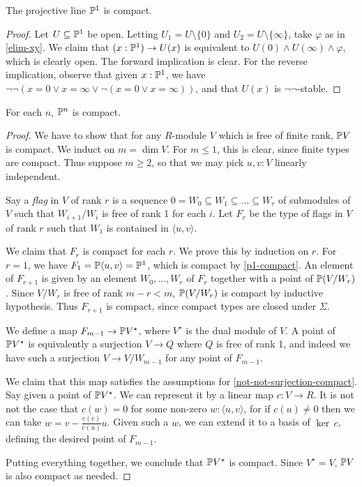 \begin{theorem}\label{p1-compact}
	The projective line $\mathbb{P}^1$ is compact.
\end{theorem}
\begin{proof}
	Let $U \subseteq \mathbb{P}^1$ be open. Letting $U_1 = U \setminus\{0\}$ and
	$U_2 = U\setminus\{\infty\}$, take $\varphi$ as in \cref{elim-xy}.
	We claim that $(x : \mathbb{P}^1) \to U(x)$ is equivalent to
	$U(0) \wedge U(\infty) \wedge \varphi$, which is clearly open.
	The forward implication is clear. For the reverse implication,
	observe that given $x : \mathbb{P}^1$, we have
	$\neg \neg(x = 0 \vee x = \infty \vee \neg (x = 0 \vee x = \infty))$,
	and that $U(x)$ is $\neg \neg$-stable.
\end{proof}

\begin{theorem}
	For each $n$, $\mathbb{P}^n$ is compact.
\end{theorem}
\begin{proof}
	We have to show that for any $R$-module $V$ which is free of finite rank,
	$\mathbb{P} V$ is compact. We induct on $m = \dim V$.
	For $m\le 1$, this is clear, since finite types are compact.
	Thus suppose $m \ge 2$, so that we may pick $u,v : V$ linearly independent.

	Say a \emph{flag} in $V$ of rank $r$ is a sequence
	$0 = W_0 \subseteq W_1 \subseteq \ldots \subseteq W_r$
	of submodules of $V$ such that $W_{i+1} / W_i$ is free of rank 1 for each $i$.
	Let $F_r$ be the type of flags in $V$ of rank $r$ such that $W_1$ is
	contained in $\langle u,v\rangle$.

	We claim that $F_r$ is compact for each $r$. We prove this by induction on $r$.
	For $r = 1$, we have $F_1 = \mathbb{P} \langle u, v \rangle = \mathbb{P}^1$, which
	is compact by \cref{p1-compact}.
	An element of $F_{r+1}$ is given by an element $W_0,\ldots,W_r$ of $F_r$
	together with a point of $\mathbb{P} (V / W_r)$.
	Since $V / W_r$ is free of rank $m - r < m$, $\mathbb{P}(V/W_r)$ is compact by inductive
	hypothesis. Thus $F_{r+1}$ is compact, since compact types are closed under $\Sigma$.

	We define a map $F_{m-1} \to \mathbb{P} V^\star$, where $V^\star$ is the dual module of $V$.
	A point of $\mathbb{P} V^\star$ is equivalently a surjection
	$V \to Q$ where $Q$ is free of rank 1, and indeed we have such a
	surjection $V \to V/W_{m-1}$ for any point of $F_{m-1}$.
	
	We claim that this map satisfies the assumptions for \cref{not-not-surjection-compact}.
	Say given a point of $\mathbb{P} V^\star$. We can represent it
	by a linear map $c : V \to R$. It is not not the case that
	$c(w) = 0$ for some non-zero $w : \langle u, v \rangle$, for
	if $c(u) \ne 0$ then we can take $w = v - \frac{c(v)}{c(u)} u$.
	Given such a $w$, we can extend it to a basis of $\ker\, c$, defining the
	desired point of $F_{m-1}$.

	Putting everything together, we conclude that $\mathbb{P} V^\star$ is compact.
	Since $V^\star = V$, $\mathbb{P} V$ is also compact as needed.
\end{proof}

